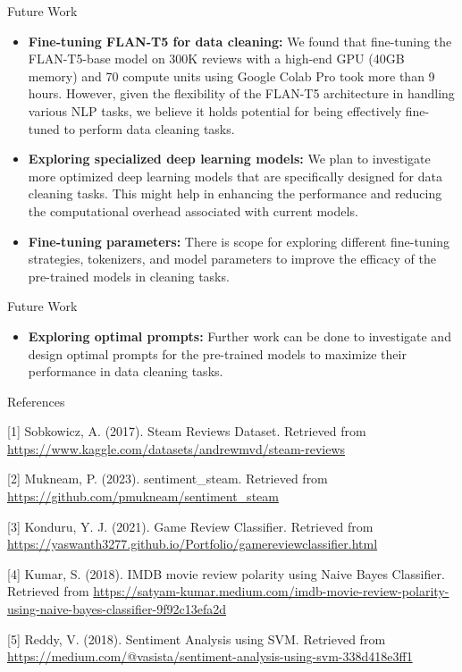 \documentclass{beamer}
\begin{document}
\begin{frame}{Future Work}

\begin{itemize}
    \item \textbf{Fine-tuning FLAN-T5 for data cleaning:} We found that fine-tuning the FLAN-T5-base model on 300K reviews with a high-end GPU (40GB memory) and 70 compute units using Google Colab Pro took more than 9 hours. However, given the flexibility of the FLAN-T5 architecture in handling various NLP tasks, we believe it holds potential for being effectively fine-tuned to perform data cleaning tasks.
    
    \item \textbf{Exploring specialized deep learning models:} We plan to investigate more optimized deep learning models that are specifically designed for data cleaning tasks. This might help in enhancing the performance and reducing the computational overhead associated with current models.
    
    \item \textbf{Fine-tuning parameters:} There is scope for exploring different fine-tuning strategies, tokenizers, and model parameters to improve the efficacy of the pre-trained models in cleaning tasks.

\end{itemize}
\end{frame}

\begin{frame}{Future Work}
\begin{itemize}

        
    \item \textbf{Exploring optimal prompts:} Further work can be done to investigate and design optimal prompts for the pre-trained models to maximize their performance in data cleaning tasks.
\end{itemize}
\end{frame}

\begin{frame}{References}

\small

[1] Sobkowicz, A. (2017). Steam Reviews Dataset. Retrieved from \url{https://www.kaggle.com/datasets/andrewmvd/steam-reviews}

[2] Mukneam, P. (2023). sentiment\_steam. Retrieved from \url{https://github.com/pmukneam/sentiment_steam}

[3] Konduru, Y. J. (2021). Game Review Classifier. Retrieved from \url{https://yaswanth3277.github.io/Portfolio/gamereviewclassifier.html}

[4] Kumar, S. (2018). IMDB movie review polarity using Naive Bayes Classifier. Retrieved from \url{https://satyam-kumar.medium.com/imdb-movie-review-polarity-using-naive-bayes-classifier-9f92c13efa2d}

[5] Reddy, V. (2018). Sentiment Analysis using SVM. Retrieved from \url{https://medium.com/@vasista/sentiment-analysis-using-svm-338d418e3ff1}




\end{frame}
\end{document}
